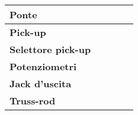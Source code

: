 \begin{table}[htbp]
{\begin{tabular}{|l|l|l|l|l|}
\textbf{Ponte}             &                       &                  &                       &                  \\ \hline
\textbf{Pick-up}           &                       &                  &                       &                  \\ \hline
\textbf{Selettore pick-up} &                       &                  &                       &                  \\ \hline
\textbf{Potenziometri}     &                       &                  &                       &                  \\ \hline
\textbf{Jack d'uscita}     &                       &                  &                       &                  \\ \hline
\textbf{Truss-rod}         &                       &                  &                       &                  \\ \hline
\end{tabular}}
\end{table}

